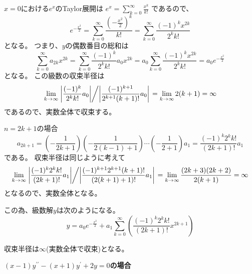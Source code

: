 \documentclass[12pt,b5paper]{ltjsarticle}
\begin{document}
$x=0$における$e^x$のTaylor展開は
$e^x = \sum_{k=0}^{\infty}\frac{x^k}{k!}$
であるので、
\begin{equation}
 e^{-\frac{x^2}{2}}
  = \sum_{k=0}^{\infty}\frac{\left(-\frac{x^2}{2}\right)^k}{k!}
  = \sum_{k=0}^{\infty}\frac{(-1)^k x^{2k}}{2^kk!}
\end{equation}
となる。
つまり、$y$の偶数番目の総和は
\begin{equation}
 \sum_{k=0}^{\infty}a_{2k}x^{2k}
  = \sum_{k=0}^{\infty}\frac{(-1)^k}{2^k k!}a_0x^{2k}
  = a_0 \sum_{k=0}^{\infty}\frac{(-1)^kx^{2k}}{2^k k!}
  = a_0 e^{-\frac{x^2}{2}}
\end{equation}
となる。
この級数の収束半径は
\begin{equation}
 \lim_{k\to\infty} \left. \left\lvert \frac{(-1)^k}{2^k k!}a_0\right\rvert \middle/ \left\lvert \frac{(-1)^{k+1}}{2^{k+1} (k+1)!}a_0\right\rvert \right.
  = \lim_{k\to\infty} 2(k+1) = \infty
\end{equation}
であるので、実数全体で収束する。



$n=2k+1$の場合
\begin{equation}
 a_{2k+1} = \left(-\frac{1}{2k+1}\right)\left(-\frac{1}{2(k-1)+1}\right)\cdots\left(-\frac{1}{2+1}\right)a_{1}
  =\frac{(-1)^k2^k k!}{(2k+1)!}a_1
\end{equation}
である。
収束半径は同じように考えて
\begin{equation}
 \lim_{k\to\infty} \left.
                    \left\lvert \frac{(-1)^k2^k k!}{(2k+1)!}a_1 \right\rvert
                    \middle/
                    \left\lvert \frac{(-1)^{k+1}2^{k+1} (k+1)!}{(2(k+1)+1)!}a_1 \right\rvert
                   \right.
  = \lim_{k\to\infty} \frac{(2k+3)(2k+2)}{2(k+1)} = \infty
\end{equation}
となるので、実数全体となる。

この為、級数解$y$は次のようになる。
\begin{equation}
 y=
  a_0 e^{-\frac{x^2}{2}}
  +
  a_1\sum_{k=0}^{\infty} \left( \frac{(-1)^k2^k k!}{(2k+1)!}x^{2k+1}  \right)
\end{equation}

収束半径は$\infty$(実数全体で収束)となる。



\dotfill
\textbf{$(x-1)y^{\prime\prime} - (x+1) y^{\prime} + 2y =0$の場合}
\dotfill


\end{document}
